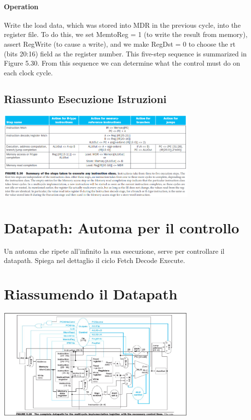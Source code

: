 \documentclass[12pt, a4paper, openany]{book}
\begin{document}
\paragraph*{Operation} Write the load data, which was stored into MDR in the previous cycle,
into the register file. To do this, we set MemtoReg = 1 (to write the result from
memory), assert RegWrite (to cause a write), and we make RegDst = 0 to choose
the rt (bits 20:16) field as the register number.
This five-step sequence is summarized in Figure 5.30. From this sequence we
can determine what the control must do on each clock cycle.

\subsection{Riassunto Esecuzione Istruzioni}
\begin{center}
    \includegraphics[width=100mm, scale=0.5]{Tabella Esecuzione Istruzioni.png}
\end{center}
\section{Datapath: Automa per il controllo}
Un automa che ripete all'infinito la sua esecuzione, serve per controllare il datapath.
Spiega nel dettaglio il ciclo Fetch Decode Execute. 

\section{Riassumendo il Datapath}
\begin{center}
    \includegraphics[width=100mm, scale=0.5]{Datapath.png}    
\end{center}
\end{document}
